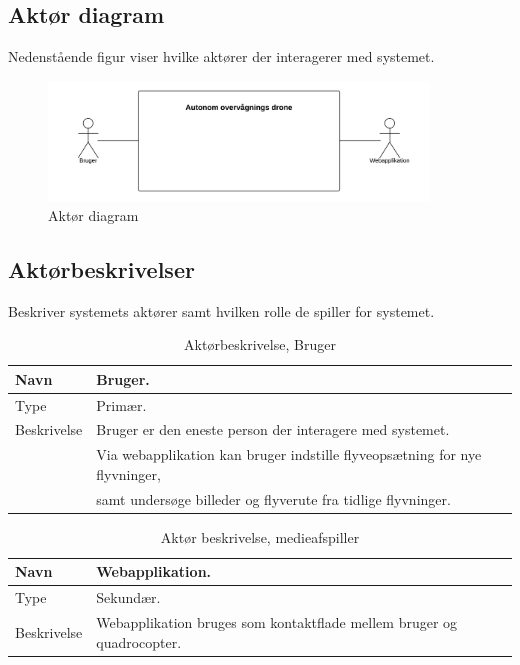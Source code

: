 \subsection{Aktør diagram}
Nedenstående figur viser hvilke aktører der interagerer med systemet.

\begin{figure}[H]
\centering
\includegraphics[width=0.9\textwidth]{billeder/Aktor_diagram.png}
\caption{Aktør diagram}
\label{fig:ACD}
\end{figure}

\subsection{Aktørbeskrivelser}
Beskriver systemets aktører samt hvilken rolle de spiller for systemet.

\begin{table}[H]
\begin{tabular}{|l|p{13.25cm}|} \hline

Navn					& Bruger. 	\\\hline
Type					& Primær.	\\\hline
Beskrivelse				& Bruger er den eneste person der interagere med systemet.\\
						& Via webapplikation kan bruger indstille flyveopsætning for nye flyvninger, \\ 
						& samt undersøge billeder og flyverute fra tidlige flyvninger.\\\hline
						
\end{tabular}
\caption{Aktørbeskrivelse, Bruger}
\label{tab:AB1}
\end{table}


\begin{table}[H]
\begin{tabular}{|l|p{13.25cm}|}
\hline
Navn					& Webapplikation. 	\\\hline
Type					& Sekundær.	\\\hline
Beskrivelse				& Webapplikation bruges som kontaktflade mellem bruger og quadrocopter.\\\hline

\end{tabular}
\caption{Aktør beskrivelse, medieafspiller}
\label{tab:AB2}
\end{table}